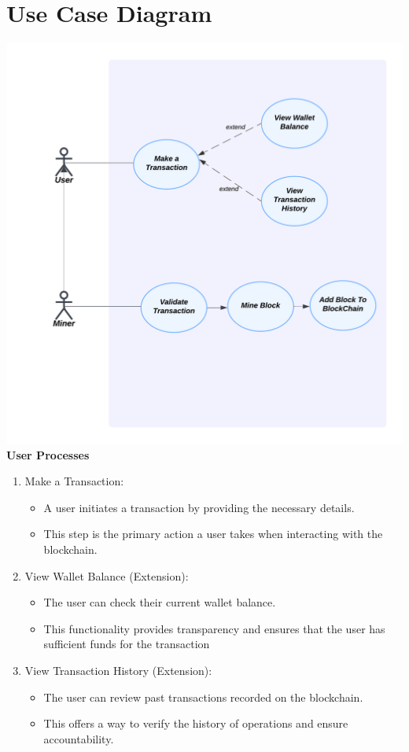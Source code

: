 \documentclass[12pt,a4paper]{report}
\begin{document}
\section{Use Case Diagram}
\includegraphics[width=\textwidth]{usecasesdiagram.png}
\textbf{User Processes}
\begin{enumerate}
    \item Make a Transaction:
        \begin{itemize}
        \item A user initiates a transaction by providing the necessary details.
        \item This step is the primary action a user takes when interacting with the blockchain.
        \end{itemize}
    
    \item View Wallet Balance (Extension):
        \begin{itemize}
        \item The user can check their current wallet balance.
        \item This functionality provides transparency and ensures that the user has sufficient funds for the transaction
        \end{itemize}
        
     \item View Transaction History (Extension):
        \begin{itemize}
        \item The user can review past transactions recorded on the blockchain.
        \item This offers a way to verify the history of operations and ensure accountability.
        \end{itemize}
\end{enumerate}
\end{document}
